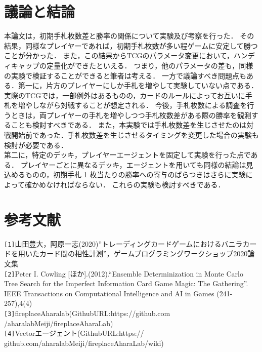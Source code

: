 \documentclass[twocolumn]{ltjsarticle}
\begin{document}
\section{議論と結論}
\small{
  本論文は，初期手札枚数差と勝率の関係について実験及び考察を行った．
  その結果，同様なプレイヤーであれば，初期手札枚数が多い程ゲームに安定して勝つことが分かった．
  また，この結果からTCGのパラメータ変更において，ハンディキャップの定量化ができたといえる．
  つまり，他のパラメータの差も，同様の実験で検証することができると筆者は考える．
  一方で議論すべき問題点もある．第一に，片方のプレイヤーにしか手札を増やして実験していない点である．
  実際のTCGでは，一部例外はあるものの，カードのルールによってお互いに手札を増やしながら対戦することが想定される．
  今後，手札枚数による調査を行うときは，両プレイヤーの手札を増やしつつ手札枚数差がある際の勝率を観測することも検討すべきである．
  また，本実験では手札枚数差を生じさせたのは対戦開始前であった．手札枚数差を生じさせるタイミングを変更した場合の実験も検討が必要である．
  \\第二に，特定のデッキ，プレイヤーエージェントを固定して実験を行った点である．
  プレイヤーごとに異なるデッキ，エージェントを用いても同様の結論は見込めるものの，初期手札 1 枚当たりの勝率への寄与のばらつきはさらに実験によって確かめなければならない．
  これらの実験も検討すべきである．
}
\section{
  参考文献
}
\small{
  \verb#[1]#山田豊大，阿原一志(2020)”トレーディングカードゲームにおけるバニラカードを用いたカード間の相性計測”，ゲームプログラミングワークショップ2020論文集
  \\
  \verb#[2]#Peter I. Cowling [ほか].(2012).“Ensemble
  Determinization in Monte Carlo Tree Search for the
  Imperfect Information Card Game Magic: The Gathering”.
  IEEE Transactions on Computational Intelligence and AI
  in Games (241-257),4(4)
  \\
  \verb#[3]#fireplaceAharalab(GithubURL:https://github.com
  /aharalabMeiji/fireplaceAharaLab)
  \\
  \verb#[4]#Vectorエージェント(GithubURL:https://
  github.com/aharalabMeiji/fireplaceAharaLab/wiki)
  

  
}
\end{document}
